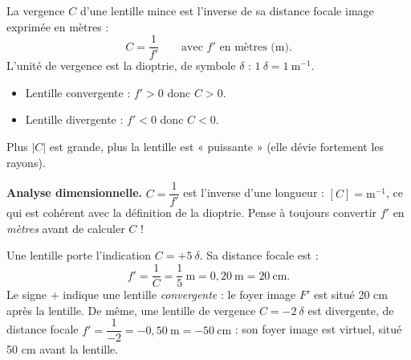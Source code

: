 \documentclass[11pt]{article}
\newcommand{\cle}[1]{{\popxbold\color{popdark}#1}}
\begin{document}
\begin{definition}[Vergence]
La \cle{vergence} $C$ d'une lentille mince est l'inverse de sa distance focale image exprimée en mètres :
\[ C = \frac{1}{f'} \qquad \text{avec } f' \text{ en mètres (m)}. \]
L'unité de vergence est la \cle{dioptrie}, de symbole $\delta$ : $1\ \delta = 1\ \text{m}^{-1}$.
\begin{itemize}
\item Lentille convergente : $f' > 0$ donc $C > 0$.
\item Lentille divergente : $f' < 0$ donc $C < 0$.
\end{itemize}
Plus $|C|$ est grande, plus la lentille est « puissante » (elle dévie fortement les rayons).
\end{definition}

\textbf{Analyse dimensionnelle.} $C = \dfrac{1}{f'}$ est l'inverse d'une longueur : $[C] = \text{m}^{-1}$, ce qui est cohérent avec la définition de la dioptrie. Pense à toujours convertir $f'$ en \emph{mètres} avant de calculer $C$ !

\begin{exemplebox}
Une lentille porte l'indication $C = +5\ \delta$. Sa distance focale est :
\[ f' = \frac{1}{C} = \frac{1}{5}\ \text{m} = 0{,}20\ \text{m} = 20\ \text{cm}. \]
Le signe $+$ indique une lentille \emph{convergente} : le foyer image $F'$ est situé 20 cm après la lentille. De même, une lentille de vergence $C = -2\ \delta$ est divergente, de distance focale $f' = \dfrac{1}{-2} = -0{,}50\ \text{m} = -50\ \text{cm}$ : son foyer image est virtuel, situé 50 cm avant la lentille.
\end{exemplebox}
\end{document}
